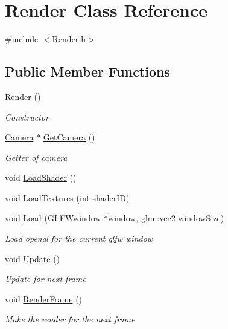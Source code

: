 \hypertarget{class_render}{}\section{Render Class Reference}
\label{class_render}


{\ttfamily \#include $<$Render.\+h$>$}

\subsection*{Public Member Functions}
\begin{DoxyCompactItemize}
\item 
\mbox{\hyperlink{class_render_a8610cc11739ef679b5935dd819021351}{Render}} ()
\begin{DoxyCompactList}\small\item\em Constructor \end{DoxyCompactList}\item 
\mbox{\hyperlink{class_camera}{Camera}} $\ast$ \mbox{\hyperlink{class_render_a268e4233d982f174d821501251f2a1ca}{Get\+Camera}} ()
\begin{DoxyCompactList}\small\item\em Getter of camera \end{DoxyCompactList}\item 
void \mbox{\hyperlink{class_render_a96d8044246a4536a9957cde6ffadb3c2}{Load\+Shader}} ()
\item 
void \mbox{\hyperlink{class_render_a7dc9ef9e079633a398019cfe85a57f5e}{Load\+Textures}} (int shader\+ID)
\item 
void \mbox{\hyperlink{class_render_a2752c2703565f6453865bda106aca415}{Load}} (G\+L\+F\+Wwindow $\ast$window, glm\+::vec2 window\+Size)
\begin{DoxyCompactList}\small\item\em Load opengl for the current glfw window \end{DoxyCompactList}\item 
void \mbox{\hyperlink{class_render_ac89a109349d00f88fc3405c3ac82ee52}{Update}} ()
\begin{DoxyCompactList}\small\item\em Update for next frame \end{DoxyCompactList}\item 
void \mbox{\hyperlink{class_render_ad1297c066156b76188c2285b40fed537}{Render\+Frame}} ()
\begin{DoxyCompactList}\small\item\em Make the render for the next frame \end{DoxyCompactList}\end{DoxyCompactItemize}


